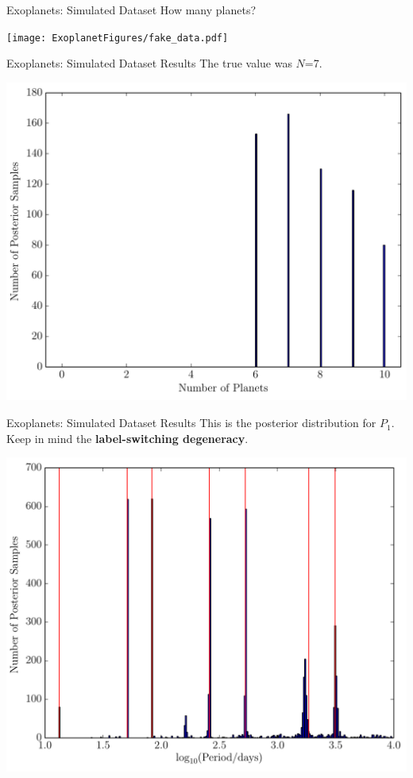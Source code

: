 \begin{frame}[t]{Exoplanets: Simulated Dataset}
How many planets?
\begin{center}
\texttt{[image: ExoplanetFigures/fake\_data.pdf]}
\end{center}
\end{frame}

\begin{frame}[t]{Exoplanets: Simulated Dataset Results}
The true value was $N$=7.
\begin{center}
\includegraphics[scale=0.35]{ExoplanetFigures/fake_data_N.pdf}
\end{center}
\end{frame}

\begin{frame}[t]{Exoplanets: Simulated Dataset Results}
This is the posterior distribution for $P_1$. Keep in mind the {\bf
label-switching degeneracy}.
\begin{center}
\includegraphics[scale=0.35]{ExoplanetFigures/fake_data_periods.pdf}
\end{center}
\end{frame}

